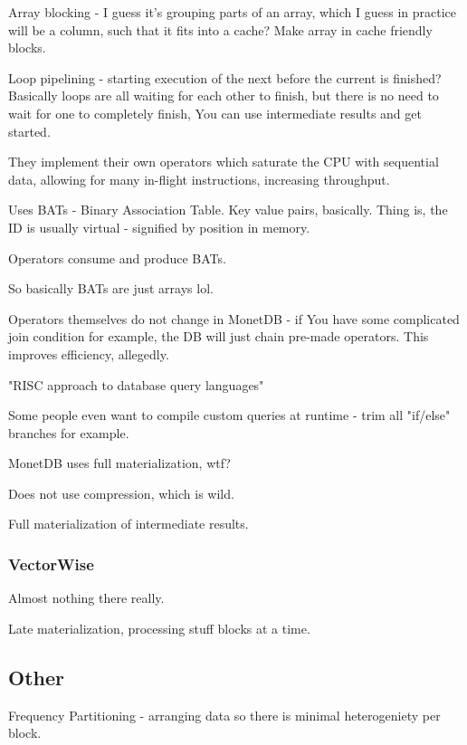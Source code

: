 \documentclass{article}
\begin{document}
			Array blocking - I guess it's grouping parts of an array, which I guess in practice will be a column, such that it fits into a cache? Make array in cache friendly blocks.
			
			Loop pipelining - starting execution of the next before the current is finished? Basically loops are all waiting for each other to finish, but there is no need to wait for one to completely finish, You can use intermediate results and get started.			
			
			They implement their own operators which saturate the CPU with sequential data, allowing for many in-flight instructions, increasing throughput.
			
			Uses BATs - Binary Association Table. Key value pairs, basically. Thing is, the ID is usually virtual - signified by position in memory.
			
			Operators consume and produce BATs.
			
			So basically BATs are just arrays lol. 
			
			Operators themselves do not change in MonetDB - if You have some complicated join condition for example, the DB will just chain pre-made operators. This improves efficiency, allegedly.
			
			"RISC approach to database query languages"
			
			Some people even want to compile custom queries at runtime - trim all "if/else" branches for example.
			
			MonetDB uses full materialization, wtf?
			
			Does not use compression, which is wild.
			
			Full materialization of intermediate results.
			
		\subsubsection{VectorWise}
		
			Almost nothing there really.
			
			Late materialization, processing stuff blocks at a time.
			
		\subsection{Other}
		
			Frequency Partitioning - arranging data so there is minimal heterogeniety per block.
			
			
			
\end{document}
